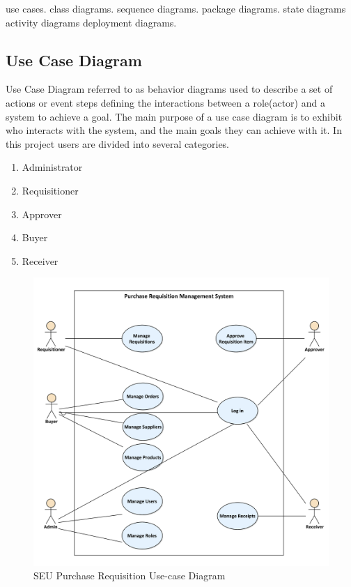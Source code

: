 \documentclass[12pt]{report} %
\begin{document}
\ifx
use cases.
class diagrams.
sequence diagrams.
package diagrams.
state diagrams
activity diagrams
deployment diagrams.

\fi


\subsection{Use Case Diagram}
Use Case Diagram referred to as behavior diagrams used to describe a set of actions or event steps defining the interactions between a role(actor) and a system to achieve a goal. The main purpose of a use case diagram is to exhibit who interacts with the system, and the main goals they can achieve with it.
In this project users are divided into several categories.
\renewcommand{\labelenumi}{\alph{enumi})}
\begin{enumerate}


		\item Administrator
		\item Requisitioner
		\item Approver
		\item Buyer
		\item Receiver
\end{enumerate}


\begin{center}
\begin{figure}[h]
	\begin{center}
	\includegraphics[width=1\textwidth]{pic/usecase/seupr_usecase_full.png}
	\end{center}
	\caption{SEU Purchase Requisition Use-case Diagram}
	\label{fig:seupr_usecase_full}
\end{figure}
\end{center}
\clearpage
\end{document}
